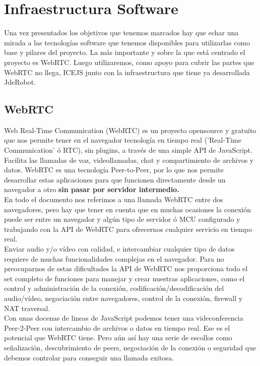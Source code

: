 \chapter{Infraestructura Software} 

Una vez presentados los objetivos que tenemos marcados hay que echar una mirada a las tecnologías software que tenemos disponibles para utilizarlas como base y pilares del proyecto. La más importante y sobre la que está centrado el proyecto es WebRTC. Luego utilizaremos, como apoyo para cubrir las partes que WebRTC no llega, ICEJS junto con la infraestructura que tiene ya desarrollada JdeRobot.


\section{WebRTC}

Web Real-Time Communication (WebRTC) es un proyecto opensource y gratuito que nos permite tener en el navegador tecnología en tiempo real ('Real-Time Communication' ó RTC), sin plugins, a través de una simple API de JavaScript. Facilita las llamadas de voz, videollamadas, chat y compartimiento de archivos y datos. WebRTC es una tecnología Peer-to-Peer, por lo que nos permite desarrollar estas aplicaciones para que funcionen directamente desde un navegador a otro \textbf{sin pasar por servidor intermedio.} \\

En todo el documento nos referimos a una llamada WebRTC entre dos navegadores, pero hay que tener en cuenta que en muchas ocasiones la conexión puede ser entre un navegador y algún tipo de servidor ó MCU configurado y trabajando con la API de WebRTC para ofrecernos cualquier servicio en tiempo real.\\

Enviar audio y/o vídeo con calidad, e intercambiar cualquier tipo de datos requiere de muchas funcionalidades complejas en el navegador. Para no preocuparnos de estas dificultades la API de WebRTC nos proporciona todo el set completo de funciones para manejar y crear nuestras aplicaciones, como el control y administración de la conexión, codificación/decodificación del audio/vídeo, negociación entre navegadores, control de la conexión, firewall y NAT traversal.\\

Con unas docenas de lineas de JavaScript podemos tener una videconferencia Peer-2-Peer con intercambio de archivos o datos en tiempo real. Ese es el potencial que WebRTC tiene. Pero aún así hay una serie de escollos como señalización, descubrimiento de peers, negociación de la conexión o seguridad que debemos controlar para conseguir una llamada exitosa.\\

